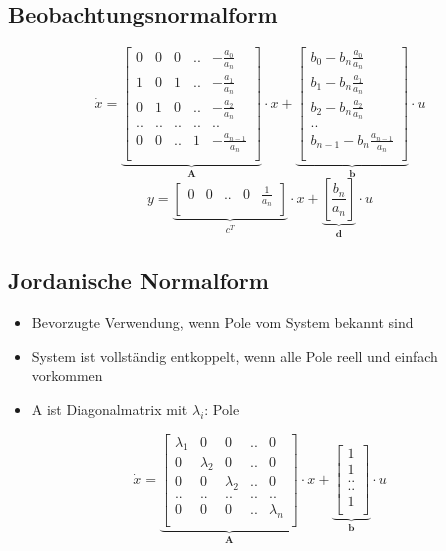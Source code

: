 \subsection{Beobachtungsnormalform}
\[
	\dot x=
	\underbrace{
		\begin{bmatrix}
			0 &	0 & 0 & .. & -\frac{a_0}{a_n}\\
			1 & 0 & 1 & .. & -\frac{a_1}{a_n}\\
			0 & 1 & 0 & .. & -\frac{a_2}{a_n}\\
			.. & .. & .. &.. & .. \\
			0 & 0 & .. & 1 &-\frac{a_{n-1}}{a_n}\\	
		\end{bmatrix}
	}_{\textbf{A}}
	\cdot x +
	\underbrace{
		\begin{bmatrix}
			b_0-b_n\frac{a_0}{a_n} \\
			b_1-b_n\frac{a_1}{a_n} \\
			b_2-b_n\frac{a_2}{a_n}  \\
			..\\
			b_{n-1}-b_n\frac{a_{n-1}}{a_n}\\	
		\end{bmatrix}
	}_{\textbf{b}}
	\cdot u	
\]
\[
	y=
	\underbrace{
			\begin{bmatrix}
				0 & 0 & .. & 0 & \frac{1}{a_n}\\
			\end{bmatrix}
	}_{\textbf{$c^T$}}
	\cdot x  +
	\underbrace{
		\left[ \frac{b_n}{a_n} \right] 
	}_{\textbf{d}}
	\cdot u
\]
\subsection{Jordanische Normalform}
\begin{itemize}
      \item Bevorzugte Verwendung, wenn Pole vom System bekannt sind
      \item System ist vollständig entkoppelt, wenn alle Pole reell und einfach vorkommen
      \item A ist Diagonalmatrix mit $\lambda_i$: Pole
\end{itemize}

\[
	\dot x=
	\underbrace{
		\begin{bmatrix}
			\lambda_1 &	0 & 0 & .. & 0\\
			0 & \lambda_2 & 0 & .. & 0\\
			0 & 0 & \lambda_2 & .. & 0\\
			.. & .. & .. &.. & .. \\
			0 & 0 & 0 & .. & \lambda_n\\	
		\end{bmatrix}
	}_{\textbf{A}}
	\cdot x +
	\underbrace{
		\begin{bmatrix}
			1 \\
			1 \\
			.. \\
			.. \\
			1\\	
		\end{bmatrix}
	}_{\textbf{b}}
	\cdot u	
\]

